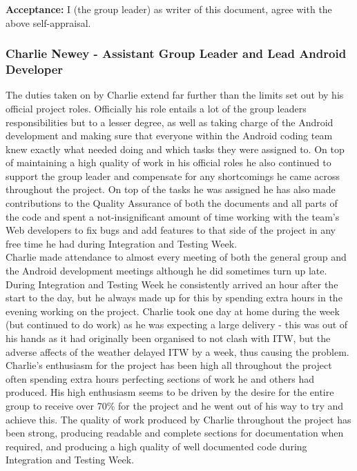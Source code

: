 \documentclass{article}
\begin{document}
		{\bf Acceptance:} I (the group leader) as writer of this document, agree with the above self-appraisal.


		\subsubsection{Charlie Newey - Assistant Group Leader and Lead Android Developer}
		The duties taken on by Charlie extend far further than the limits set out by his official project roles. Officially his role entails a lot of the group leaders responsibilities but to a lesser degree, as well as taking charge of the Android development and making sure that everyone within the Android coding team knew exactly what needed doing and which tasks they were assigned to. On top of maintaining a high quality of work in his official roles he also continued to support the group leader and compensate for any shortcomings he came across throughout the project. On top of the tasks he was assigned he has also made contributions to the Quality Assurance of both the documents and all parts of the code and spent a not-insignificant amount of time working with the team's Web developers to fix bugs and add features to that side of the project in any free time he had during Integration and Testing Week. \\
		
		Charlie made attendance to almost every meeting of both the general group and the Android development meetings although he did sometimes turn up late. During Integration and Testing Week he consistently arrived an hour after the start to the day, but he always made up for this by spending extra hours in the evening working on the project. Charlie took one day at home during the week (but continued to do work) as he was expecting a large delivery - this was out of his hands as it had originally been organised to not clash with ITW, but the adverse affects of the weather delayed ITW by a week, thus causing the problem. \\
		
		Charlie's enthusiasm for the project has been high all throughout the project often spending extra hours perfecting sections of work he and others had produced. His high enthusiasm seems to be driven by the desire for the entire group to receive over 70\% for the project and he went out of his way to try and achieve this. The quality of work produced by Charlie throughout the project has been strong, producing readable and complete sections for documentation when required, and producing a high quality of well documented code during Integration and Testing Week. \\
		
\end{document}
